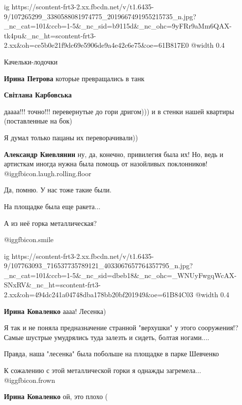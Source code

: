  
 
 
 
 

\ifcmt
  ig https://scontent-frt3-2.xx.fbcdn.net/v/t1.6435-9/107265299_3380588081974775_2019667491955215735_n.jpg?_nc_cat=101&ccb=1-5&_nc_sid=b9115d&_nc_ohc=9yFRr9aMm6QAX-tk4pu&_nc_ht=scontent-frt3-2.xx&oh=ce5b0e21f9dc69e5906de9a4e42c6e75&oe=61B817E0
  @width 0.4
\fi

Качельки-лодочки

\textbf{Ирина Петрова} которые превращались в танк

\textbf{Світлана Карбовська} 

даааа!!! точно!!! перевернутые до гори дригом))) и в стенки нашей квартиры
(поставленные на бок)

Я думал только пацаны их переворачивали))

\textbf{Александр Киевлянин} ну, да, конечно, привилегия была их! Но, ведь и артисткам иногда нужна была помощь от назойливых поклонников! @igg{fbicon.laugh.rolling.floor} 

Да, помню. У нас тоже такие были.

На площадке была еще ракета...

А из неё горка металлическая?

 @igg{fbicon.smile} 

\ifcmt
  ig https://scontent-frt3-2.xx.fbcdn.net/v/t1.6435-9/107763093_716537735789121_4033067657764357795_n.jpg?_nc_cat=101&ccb=1-5&_nc_sid=dbeb18&_nc_ohc=_WNUyFwgqWcAX-SNxRV&_nc_ht=scontent-frt3-2.xx&oh=494dc241a04748dba178bb20bf201949&oe=61B84C03
  @width 0.4
\fi

\textbf{Ирина Коваленко} аааа! Лесенка)


Я так и не поняла предназначение странной "верхушки" у этого сооружения!? Самые
шустрые умудрялись туда залезть и сидеть, болтая ногами....

Правда, наша "лесенка" была побольше на площадке в парке Шевченко

К сожалению с этой металлической горки я однажды загремела...  @igg{fbicon.frown} 

\textbf{Ирина Коваленко} ой, это плохо (
